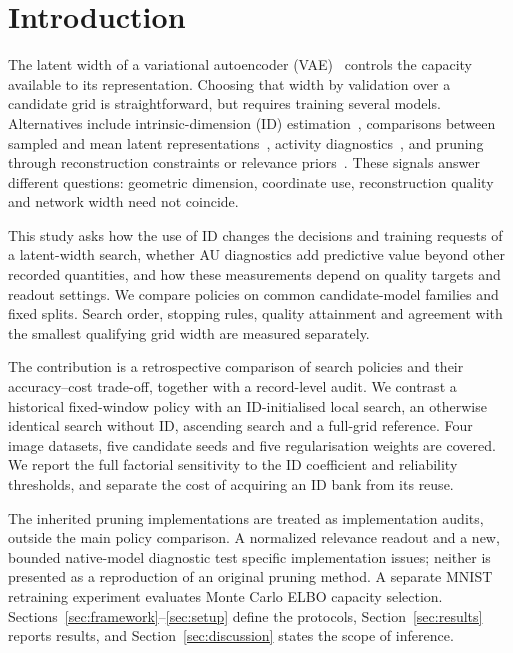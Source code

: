 \documentclass[make,article,submit,pdftex,moreauthors]{Definitions/mdpi}
\begin{document}
\section{Introduction}\label{sec:intro}

The latent width of a variational autoencoder (VAE)~\cite{kingma2014vae}
controls the capacity available to its representation. Choosing that width
by validation over a candidate grid is straightforward, but requires
training several models. Alternatives include intrinsic-dimension (ID)
estimation~\cite{facco2017twonn,levina2005mle}, comparisons between sampled
and mean latent representations~\cite{bonheme2022fondue}, activity
diagnostics~\cite{burda2016iwae,bonheme2023active}, and pruning through
reconstruction constraints or relevance priors~\cite{deboom2020geco,saha2025ardvae}.
These signals answer different questions: geometric dimension, coordinate
use, reconstruction quality and network width need not coincide.

This study asks how the use of ID changes the decisions and training
requests of a latent-width search, whether AU diagnostics add predictive
value beyond other recorded quantities, and how these measurements depend
on quality targets and readout settings. We compare policies on common
candidate-model families and fixed splits. Search order, stopping rules,
quality attainment and agreement with the smallest qualifying grid width
are measured separately.

The contribution is a retrospective comparison of search policies and
their accuracy--cost trade-off, together with a record-level audit.
We contrast a historical fixed-window policy with an ID-initialised
local search, an otherwise identical search without ID, ascending search
and a full-grid reference. Four image datasets, five candidate seeds and
five regularisation weights are covered. We report the full factorial
sensitivity to the ID coefficient and reliability thresholds, and separate
the cost of acquiring an ID bank from its reuse.

The inherited pruning implementations are treated as implementation audits,
outside the main policy comparison. A normalized relevance readout and a
new, bounded native-model diagnostic test specific implementation issues;
neither is presented as a reproduction of an original pruning method.
A separate MNIST retraining experiment evaluates Monte Carlo ELBO capacity
selection. Sections~\ref{sec:framework}--\ref{sec:setup} define the protocols,
Section~\ref{sec:results} reports results, and
Section~\ref{sec:discussion} states the scope of inference.
\end{document}
